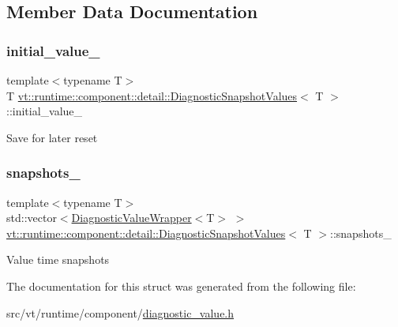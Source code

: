 \subsection{Member Data Documentation}
\mbox{\label{structvt_1_1runtime_1_1component_1_1detail_1_1_diagnostic_snapshot_values_af4817919ef8c294ce8e3e45e2f3d914d}} 
\subsubsection{\texorpdfstring{initial\+\_\+value\+\_\+}{initial\_value\_}}
{\footnotesize\ttfamily template$<$typename T$>$ \\
T \hyperlink{structvt_1_1runtime_1_1component_1_1detail_1_1_diagnostic_snapshot_values}{vt\+::runtime\+::component\+::detail\+::\+Diagnostic\+Snapshot\+Values}$<$ T $>$\+::initial\+\_\+value\+\_\+\hspace{0.3cm}{\ttfamily [protected]}}

Save for later reset \mbox{\label{structvt_1_1runtime_1_1component_1_1detail_1_1_diagnostic_snapshot_values_aa88c82ca31224456d8daf7efe44b60fb}} 
\subsubsection{\texorpdfstring{snapshots\+\_\+}{snapshots\_}}
{\footnotesize\ttfamily template$<$typename T$>$ \\
std\+::vector$<$\hyperlink{structvt_1_1runtime_1_1component_1_1detail_1_1_diagnostic_value_wrapper}{Diagnostic\+Value\+Wrapper}$<$T$>$ $>$ \hyperlink{structvt_1_1runtime_1_1component_1_1detail_1_1_diagnostic_snapshot_values}{vt\+::runtime\+::component\+::detail\+::\+Diagnostic\+Snapshot\+Values}$<$ T $>$\+::snapshots\+\_\+\hspace{0.3cm}{\ttfamily [protected]}}

Value time snapshots 

The documentation for this struct was generated from the following file\+:\begin{DoxyCompactItemize}
\item 
src/vt/runtime/component/\hyperlink{diagnostic__value_8h}{diagnostic\+\_\+value.\+h}\end{DoxyCompactItemize}
